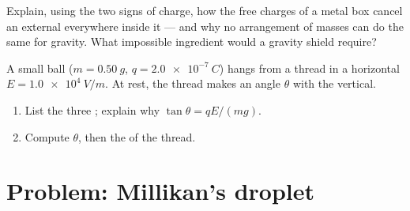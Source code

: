 \begin{exercise}[$\star\star\star$]\label{exo:g11:electric-gravitational-fields:14}
Explain, using the two signs of charge, how the free charges of a metal
box cancel an external  everywhere inside it --- and why
no arrangement of masses can do the same for gravity. What impossible
ingredient would a gravity shield require?
\end{exercise}

\begin{exercise}[$\star\star\star$]\label{exo:g11:electric-gravitational-fields:15}
A small ball ($m = \qty{0.50}{g}$, $q = \qty{+2.0e-7}{C}$) hangs from a
thread in a horizontal  $E = \qty{1.0e4}{V/m}$. At rest,
the thread makes an angle $\theta$ with the vertical.
\begin{enumerate}
  \item List the three ; explain why $\tan\theta = qE / (mg)$.
  \item Compute $\theta$, then the  of the thread.
\end{enumerate}
\end{exercise}

\section{Problem: Millikan's droplet}

